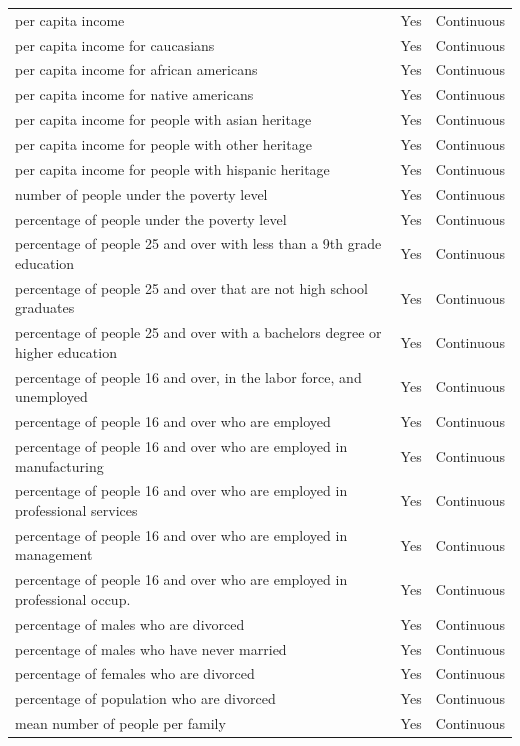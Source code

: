 \documentclass[
  11pt,
]{article}
\begin{document}
\begin{longtable}[t]{lll}
\addlinespace
per capita income & Yes & Continuous\\
per capita income for caucasians & Yes & Continuous\\
per capita income for african americans & Yes & Continuous\\
per capita income for native americans & Yes & Continuous\\
per capita income for people with asian heritage & Yes & Continuous\\
\addlinespace
per capita income for people with other heritage & Yes & Continuous\\
per capita income for people with hispanic heritage & Yes & Continuous\\
number of people under the poverty level & Yes & Continuous\\
percentage of people under the poverty level & Yes & Continuous\\
percentage of people 25 and over with less than a 9th grade education & Yes & Continuous\\
\addlinespace
percentage of people 25 and over that are not high school graduates & Yes & Continuous\\
percentage of people 25 and over with a bachelors degree or higher education & Yes & Continuous\\
percentage of people 16 and over, in the labor force, and unemployed & Yes & Continuous\\
percentage of people 16 and over who are employed & Yes & Continuous\\
percentage of people 16 and over who are employed in manufacturing & Yes & Continuous\\
\addlinespace
percentage of people 16 and over who are employed in professional services & Yes & Continuous\\
percentage of people 16 and over who are employed in management & Yes & Continuous\\
percentage of people 16 and over who are employed in professional occup. & Yes & Continuous\\
percentage of males who are divorced & Yes & Continuous\\
percentage of males who have never married & Yes & Continuous\\
\addlinespace
percentage of females who are divorced & Yes & Continuous\\
percentage of population who are divorced & Yes & Continuous\\
mean number of people per family & Yes & Continuous\\

\end{longtable}
\end{document}
